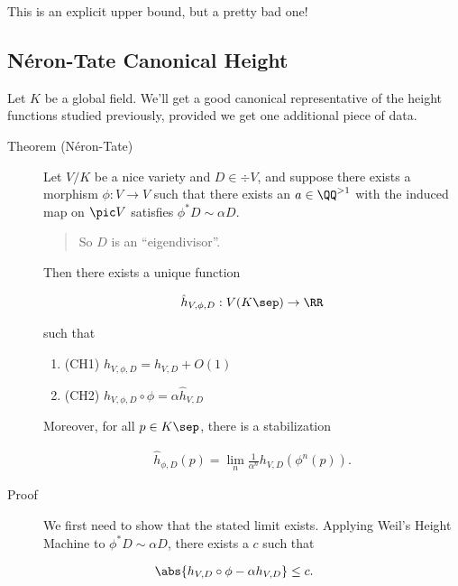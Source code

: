 This is an explicit upper bound, but a pretty bad one!

\hypertarget{nuxe9ron-tate-canonical-height}{%
\subsection{Néron-Tate Canonical
Height}\label{nuxe9ron-tate-canonical-height}}

Let \(K\) be a global field. We'll get a good canonical representative
of the height functions studied previously, provided we get one
additional piece of data.

\begin{description}
\item[Theorem (Néron-Tate)]
Let \(V/K\) be a nice variety and \(D \in \div V\), and suppose there
exists a morphism \(\phi: V\to V\) such that there exists an
\(a\in \QQ^{> 1}\) with the induced map on \(\pic V\) satisfies
\(\phi^* D \sim \alpha D\).

\begin{quote}
So \(D\) is an ``eigendivisor''.
\end{quote}

Then there exists a unique function

\begin{align*}
\hat{h}_{V, \phi, D}: V(K\sep) \to \RR
\end{align*}

such that

\begin{enumerate}
\def\labelenumi{\arabic{enumi}.}
\item
  (CH1) \(\hat h_{V, \phi, D} = h_{V, D} + O(1)\)
\item
  (CH2) \(\hat h_{V, \phi, D} \circ \phi = \alpha \hat h_{V, D}\)
\end{enumerate}

Moreover, for all \(p\in K\sep\), there is a stabilization

\begin{align*}
\hat h_{\phi, D}(p) = \lim_n \frac{1}{\alpha^n} h_{V, D}(\phi^n(p))
.\end{align*}
\item[Proof]
We first need to show that the stated limit exists. Applying Weil's
Height Machine to \(\phi^* D \sim \alpha D\), there exists a \(c\) such
that
\end{description}

\begin{align*}
  \abs{ h_{V, D} \circ \phi  - \alpha h_{V, D}} \leq c
  .\end{align*}

